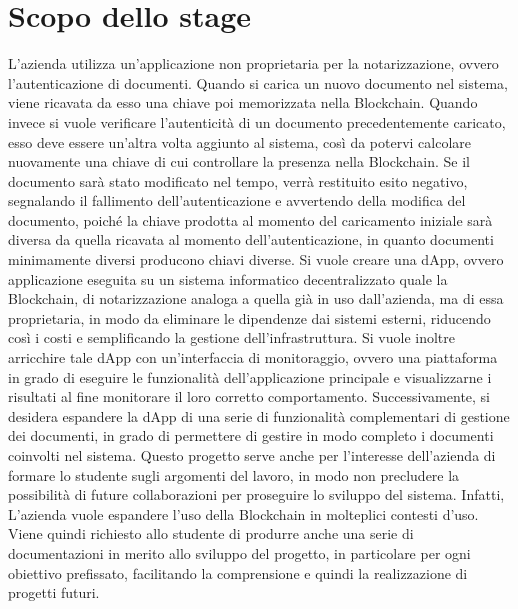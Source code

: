 \section*{Scopo dello stage}
L'azienda utilizza un'applicazione non proprietaria per la notarizzazione, ovvero l'autenticazione di documenti. Quando si carica un nuovo documento nel sistema, viene ricavata da esso una chiave poi memorizzata nella Blockchain. 
Quando invece si vuole verificare l'autenticità di un documento precedentemente caricato, esso deve essere un'altra volta aggiunto al sistema, così da potervi calcolare nuovamente una chiave di cui controllare la presenza nella Blockchain. Se il documento sarà stato modificato nel tempo, verrà restituito esito negativo, segnalando il fallimento dell'autenticazione e avvertendo della modifica del documento, poiché la chiave prodotta al momento del caricamento iniziale sarà diversa da quella ricavata al momento dell'autenticazione, in quanto documenti minimamente diversi producono chiavi diverse.
\newline
Si vuole creare una dApp, ovvero applicazione eseguita su un sistema informatico decentralizzato quale la Blockchain, di notarizzazione analoga a quella già in uso dall'azienda, ma di essa proprietaria, in modo da eliminare le dipendenze dai sistemi esterni, riducendo così i costi e semplificando la gestione dell'infrastruttura. Si vuole inoltre arricchire tale dApp con un'interfaccia di monitoraggio, ovvero una piattaforma in grado di eseguire le funzionalità dell'applicazione principale e visualizzarne i risultati al fine monitorare il loro corretto comportamento. Successivamente, si desidera espandere la dApp di una serie di funzionalità complementari di gestione dei documenti, in grado di permettere di gestire in modo completo i documenti coinvolti nel sistema. 
\newline
Questo progetto serve anche per l'interesse dell'azienda di formare lo studente sugli argomenti del lavoro, in modo non precludere la possibilità di future collaborazioni per proseguire lo sviluppo del sistema. Infatti, L'azienda vuole espandere l'uso della Blockchain in molteplici contesti d'uso. Viene quindi richiesto allo studente di produrre anche una serie di documentazioni in merito allo sviluppo del progetto, in particolare per ogni obiettivo prefissato, facilitando la comprensione e quindi la realizzazione di progetti futuri.
